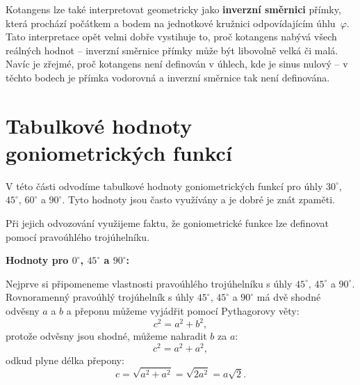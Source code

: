 \documentclass[12pt,a4paper]{article}
\begin{document}
Kotangens lze také interpretovat geometricky jako \textbf{inverzní směrnici} přímky, která prochází počátkem
a bodem na jednotkové kružnici odpovídajícím úhlu~$\varphi$. Tato interpretace opět velmi dobře vystihuje
to, proč kotangens nabývá všech reálných hodnot – inverzní směrnice přímky může být libovolně velká či malá.
Navíc je zřejmé, proč kotangens není definován v úhlech, kde je sinus nulový – v těchto bodech je přímka
vodorovná a inverzní směrnice tak není definována.



\newpage


\section{Tabulkové hodnoty goniometrických funkcí}

V této části odvodíme tabulkové hodnoty goniometrických funkcí pro úhly $30^\circ$, $45^\circ$, $60^\circ$ a $90^\circ$.
Tyto hodnoty jsou často využívány a je dobré je znát zpaměti.

Při jejich odvozování využijeme faktu, že goniometrické funkce lze definovat pomocí pravoúhlého trojúhelníku.

\bigskip
\textbf{Hodnoty pro $0^\circ$, $45^\circ$ a $90^\circ$:}

Nejprve si připomeneme vlastnosti pravoúhlého trojúhelníku s úhly $45^\circ$, $45^\circ$ a $90^\circ$. 
Rovnoramenný pravoúhlý trojúhelník s úhly $45^\circ$, $45^\circ$ a $90^\circ$ má dvě shodné odvěsny $a$ a $b$ 
a přeponu můžeme vyjádřit pomocí Pythagorovy věty:
\[
c^2 = a^2 + b^2,
\]
protože odvěsny jsou shodné, můžeme nahradit $b$ za $a$:
\[
c^2 = a^2 + a^2,
\]
odkud plyne délka přepony:
\[
c = \sqrt{a^2 + a^2} = \sqrt{2a^2} = a\sqrt{2}.
\]

\begin{center}
\end{center}
\end{document}
